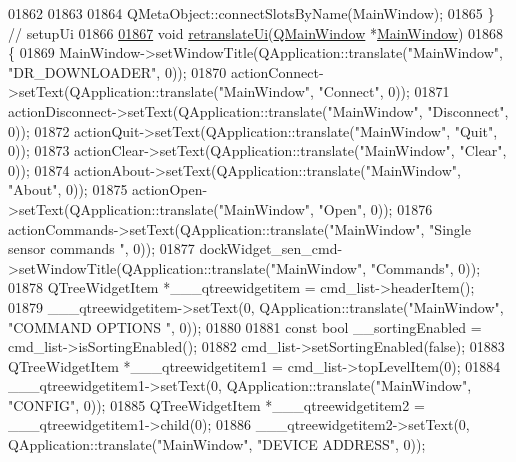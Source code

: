 \begin{DoxyCode}
01862 
01863 
01864         QMetaObject::connectSlotsByName(MainWindow);
01865     \} \textcolor{comment}{// setupUi}
01866 
\hypertarget{a00052_source_l01867}{}\hyperlink{a00027_a097dd160c3534a204904cb374412c618}{01867}     \textcolor{keywordtype}{void} \hyperlink{a00027_a097dd160c3534a204904cb374412c618}{retranslateUi}(\hyperlink{a00010}{QMainWindow} *\hyperlink{a00006}{MainWindow})
01868     \{
01869         MainWindow->setWindowTitle(QApplication::translate(\textcolor{stringliteral}{"MainWindow"}, \textcolor{stringliteral}{"DR\_DOWNLOADER"}, 0));
01870         actionConnect->setText(QApplication::translate(\textcolor{stringliteral}{"MainWindow"}, \textcolor{stringliteral}{"Connect"}, 0));
01871         actionDisconnect->setText(QApplication::translate(\textcolor{stringliteral}{"MainWindow"}, \textcolor{stringliteral}{"Disconnect"}, 0));
01872         actionQuit->setText(QApplication::translate(\textcolor{stringliteral}{"MainWindow"}, \textcolor{stringliteral}{"Quit"}, 0));
01873         actionClear->setText(QApplication::translate(\textcolor{stringliteral}{"MainWindow"}, \textcolor{stringliteral}{"Clear"}, 0));
01874         actionAbout->setText(QApplication::translate(\textcolor{stringliteral}{"MainWindow"}, \textcolor{stringliteral}{"About"}, 0));
01875         actionOpen->setText(QApplication::translate(\textcolor{stringliteral}{"MainWindow"}, \textcolor{stringliteral}{"Open"}, 0));
01876         actionCommands->setText(QApplication::translate(\textcolor{stringliteral}{"MainWindow"}, \textcolor{stringliteral}{"Single sensor commands "}, 0));
01877         dockWidget\_sen\_cmd->setWindowTitle(QApplication::translate(\textcolor{stringliteral}{"MainWindow"}, \textcolor{stringliteral}{"Commands"}, 0));
01878         QTreeWidgetItem *\_\_\_qtreewidgetitem = cmd\_list->headerItem();
01879         \_\_\_qtreewidgetitem->setText(0, QApplication::translate(\textcolor{stringliteral}{"MainWindow"}, \textcolor{stringliteral}{"COMMAND OPTIONS  "}, 0));
01880 
01881         \textcolor{keyword}{const} \textcolor{keywordtype}{bool} \_\_sortingEnabled = cmd\_list->isSortingEnabled();
01882         cmd\_list->setSortingEnabled(\textcolor{keyword}{false});
01883         QTreeWidgetItem *\_\_\_qtreewidgetitem1 = cmd\_list->topLevelItem(0);
01884         \_\_\_qtreewidgetitem1->setText(0, QApplication::translate(\textcolor{stringliteral}{"MainWindow"}, \textcolor{stringliteral}{"CONFIG"}, 0));
01885         QTreeWidgetItem *\_\_\_qtreewidgetitem2 = \_\_\_qtreewidgetitem1->child(0);
01886         \_\_\_qtreewidgetitem2->setText(0, QApplication::translate(\textcolor{stringliteral}{"MainWindow"}, \textcolor{stringliteral}{"DEVICE ADDRESS"}, 0));

\end{DoxyCode}
